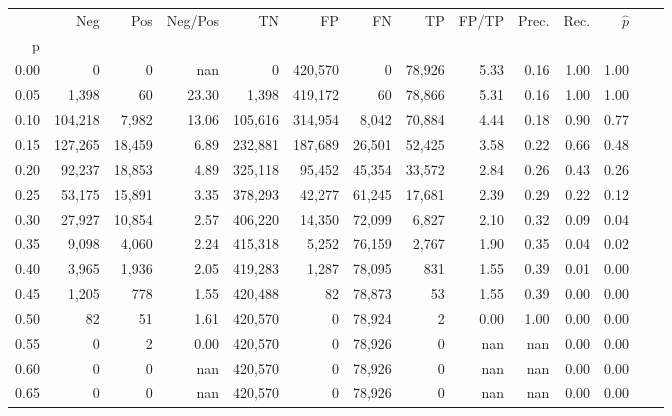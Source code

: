 \begin{tabular}{rrrrrrrrrrrrrr}
\toprule
{} &      Neg &     Pos & Neg/Pos &       TN &       FP &      FN &      TP & FP/TP & Prec. &  Rec. & $\hat{p}$ \\
p    &          &         &         &          &          &         &         &       &       &       &           \\
\midrule
0.00 &        0 &       0 &     nan &        0 &  420,570 &       0 &  78,926 &  5.33 &  0.16 &  1.00 &      1.00 \\
0.05 &    1,398 &      60 &   23.30 &    1,398 &  419,172 &      60 &  78,866 &  5.31 &  0.16 &  1.00 &      1.00 \\
0.10 &  104,218 &   7,982 &   13.06 &  105,616 &  314,954 &   8,042 &  70,884 &  4.44 &  0.18 &  0.90 &      0.77 \\
0.15 &  127,265 &  18,459 &    6.89 &  232,881 &  187,689 &  26,501 &  52,425 &  3.58 &  0.22 &  0.66 &      0.48 \\
0.20 &   92,237 &  18,853 &    4.89 &  325,118 &   95,452 &  45,354 &  33,572 &  2.84 &  0.26 &  0.43 &      0.26 \\
0.25 &   53,175 &  15,891 &    3.35 &  378,293 &   42,277 &  61,245 &  17,681 &  2.39 &  0.29 &  0.22 &      0.12 \\
0.30 &   27,927 &  10,854 &    2.57 &  406,220 &   14,350 &  72,099 &   6,827 &  2.10 &  0.32 &  0.09 &      0.04 \\
0.35 &    9,098 &   4,060 &    2.24 &  415,318 &    5,252 &  76,159 &   2,767 &  1.90 &  0.35 &  0.04 &      0.02 \\
0.40 &    3,965 &   1,936 &    2.05 &  419,283 &    1,287 &  78,095 &     831 &  1.55 &  0.39 &  0.01 &      0.00 \\
0.45 &    1,205 &     778 &    1.55 &  420,488 &       82 &  78,873 &      53 &  1.55 &  0.39 &  0.00 &      0.00 \\
0.50 &       82 &      51 &    1.61 &  420,570 &        0 &  78,924 &       2 &  0.00 &  1.00 &  0.00 &      0.00 \\
0.55 &        0 &       2 &    0.00 &  420,570 &        0 &  78,926 &       0 &   nan &   nan &  0.00 &      0.00 \\
0.60 &        0 &       0 &     nan &  420,570 &        0 &  78,926 &       0 &   nan &   nan &  0.00 &      0.00 \\
0.65 &        0 &       0 &     nan &  420,570 &        0 &  78,926 &       0 &   nan &   nan &  0.00 &      0.00 \\

\end{tabular}
